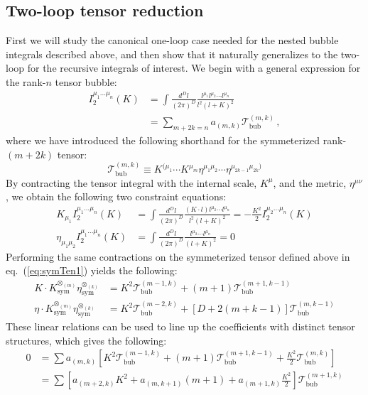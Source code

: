 \documentclass[11pt,letter]{article}
\def\eqn#1{eq.~(\ref{#1})}
\begin{document}
\subsection{Two-loop tensor reduction}\label{sec:tenRed}
First we will study the canonical one-loop case needed for the nested bubble integrals described above, and then show that it naturally generalizes to the two-loop for the recursive integrals of interest. We begin with a general expression for the rank-$n$ tensor bubble:
\begin{align}
     I^{\mu_1\dots \mu_n}_2(K)&= \int \frac{d^D l}{(2\pi)^D} \frac{l^{\mu_1}l^{\mu_2}\cdots l^{\mu_n} }{l^2(l+K)^2}
     \\
     &= \sum_{m+2k=n}a_{(m,k)} \mathcal{T}^{(m,k)}_{\text{bub}} \,,\label{tensorReductionBubble}
\end{align}
where we have introduced the following shorthand for the symmeterized rank-$(m+2k)$ tensor:
\begin{equation}\label{eq:symTen1}
\mathcal{T}^{(m,k)}_{\text{bub}}  \equiv K^{(\mu_1}\cdots K^{\mu_m}\eta^{\mu_1\mu_2}\cdots \eta^{\mu_{2k-1}\mu_{2k})}
\end{equation}
By contracting the tensor integral with the internal scale, $K^\mu$, and the metric, $\eta^{\mu\nu}$, we obtain the following two constraint equations:
\begin{align}
K_{\mu_1}I^{\mu_1\dots \mu_n}_2(K) &= \int \frac{d^D l}{(2\pi)^D} \frac{ (K\cdot l) l^{\mu_2}\cdots l^{\mu_n}}{l^2(l+K)^2}= -\frac{K^2}{2}I^{\mu_2\dots \mu_n}_2(K) 
\\
\eta_{\mu_1 \mu_2}I^{\mu_1\dots \mu_n}_2(K)&= \int \frac{d^D l}{(2\pi)^D} \frac{  l^{\mu_2}\cdots l^{\mu_n}}{(l+K)^2}=0
\end{align}
Performing the same contractions on the symmeterized tensor defined above in \eqn{eq:symTen1} yields the following:
\begin{align}
K\cdot K^{\otimes_{(m)}}_{\text{sym}}\eta_{\text{sym}}^{\otimes_{(k)}} &= K^2 \mathcal{T}^{(m-1,k)}_{\text{bub}} + (m+1)\mathcal{T}^{(m+1,k-1)}_{\text{bub}}
\\
\eta \cdot K^{\otimes_{(m)}}_{\text{sym}}\eta_{\text{sym}}^{\otimes_{(k)}} &= K^2 \mathcal{T}^{(m-2,k)}_{\text{bub}} + \left[D+2(m+k-1)\right]\mathcal{T}^{(m,k-1)}_{\text{bub}}
\end{align}
These linear relations can be used to line up the coefficients with distinct tensor structures, which gives the following:
\begin{align}
0&= \sum a_{(m,k)}\left[K^2 \mathcal{T}^{(m-1,k)}_{\text{bub}}+ (m+1)\mathcal{T}^{(m+1,k-1)}_{\text{bub}} +\frac{K^2}{2}\mathcal{T}^{(m,k)}_{\text{bub}}\right]
\\
&= \sum \left[a_{(m+2,k)} K^2 + a_{(m,k+1)} (m+1) +a_{(m+1,k)}\frac{K^2}{2}\right]\mathcal{T}^{(m+1,k)}_{\text{bub}}\end{align}
\end{document}
